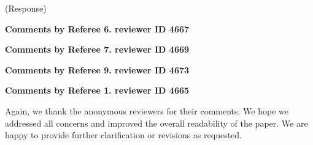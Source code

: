 \documentclass{letter}
\begin{document}
{\color{red}(Response)}



{\bf Comments by Referee 6. reviewer ID 4667}

{\bf Comments by Referee 7. reviewer ID 4669}

{\bf Comments by Referee 9. reviewer ID 4673}

{\bf Comments by Referee 1. reviewer ID 4665}

Again, we thank the anonymous reviewers for their comments. We hope we 
addressed all concerns and improved the overall readability of the paper. We are happy to provide further clarification or revisions as requested.


\small
%


\end{document}
